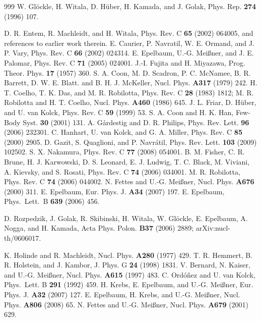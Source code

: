 \documentclass[sort&compress,preprint,3p]{elsarticle}
\begin{document}
\begin{thebibliography}{999}
W. Gl\"ockle, H. Witala, D. H\"uber, H. Kamada, and J. Golak,
Phys. Rep. {\bf 274} (1996) 107.

 D. R. Entem, R. Machleidt, and H. Witala,
Phys. Rev. C {\bf 65} (2002) 064005, and references to earlier work therein.
E. Caurier, P. Navratil, W. E. Ormand, and J. P. Vary,
Phys. Rev. C {\bf 66} (2002) 024314.
E. Epelbaum, U.-G. Mei\ss ner, and J. E. Palomar,
Phys. Rev. C {\bf 71} (2005) 024001.
J.-I. Fujita and H. Miyazawa, Prog. Theor. Phys. {\bf 17} (1957) 360. 
S. A. Coon, M. D. Scadron, P. C. McNamee, B. R. Barrett, D. W. E. Blatt. and B. H. J. McKeller,
Nucl. Phys. {\bf A317} (1979) 242.
H. T. Coelho, T. K. Das, and M. R. Robilotta,
Phys. Rev. C {\bf 28} (1983) 1812;
M. R. Robilotta and H. T. Coelho,
Nucl. Phys. {\bf A460} (1986) 645.
J. L. Friar, D. H\"uber, and U. van Kolck,
Phys. Rev. C {\bf 59} (1999) 53.
S. A. Coon and H. K. Han, Few-Body Syst. {\bf 30} (2001) 131.
A. G\aa rdestig and D. R. Philips, Phys. Rev. Lett. {\bf 96} (2006) 232301.
C. Hanhart, U. van Kolck, and G. A. Miller,
Phys. Rev. C {\bf 85} (2000) 2905.
D. Gazit, S. Quaglioni, and P. Navr\'atil, Phys. Rev. Lett. {\bf 103} (2009) 102502. 
S. X. Nakamura, Phys. Rev. C {\bf 77} (2008) 054001. 
B. M. Fisher, C. R. Brune, H. J. Karwowski, D. S. Leonard, E. J. Ludwig, 
T. C. Black,  M. Viviani, A. Kievsky, and S. Rosati, 
Phys. Rev. C {\bf 74} (2006) 034001.
M. R. Robilotta, 
Phys. Rev. C {\bf 74} (2006) 044002.
N. Fettes and U.-G. Mei\ss ner,  
Nucl. Phys. {\bf A676} (2000) 311.
E. Epelbaum, Eur. Phys. J. {\bf A34} (2007) 197.
E. Epelbaum, Phys.\ Lett.\ B {\bf 639} (2006) 456.

D. Rozpedzik, J. Golak, R. Skibinski, H. Witala, W. Gl\"ockle, E. Epelbaum,  A. Nogga, and H. Kamada,
Acta Phys. Polon. {\bf B37} (2006) 2889;
arXiv:nucl-th/0606017.

K. Holinde and R. Machleidt, Nucl. Phys. {\bf A280} (1977) 429.
T. R. Hemmert, B. R. Holstein, and J. Kambor,
J. Phys. G {\bf 24} (1998) 1831.
V. Bernard, N. Kaiser, and U.-G. Mei\ss ner,
Nucl. Phys. {\bf A615} (1997) 483.
C. Ord\'o\~nez and U. van Kolck,
Phys.\ Lett. B {\bf 291} (1992) 459.
H. Krebs, E. Epelbaum, and U.-G. Mei\ss ner,
Eur. Phys. J. {\bf A32} (2007) 127.
E. Epelbaum, H. Krebs, and U.-G. Mei\ss ner,
Nucl. Phys. {\bf A806} (2008) 65.
N. Fettes and U.-G. Mei\ss ner, Nucl. Phys. {\bf A679} (2001) 629.


\end{thebibliography}
\end{document}
